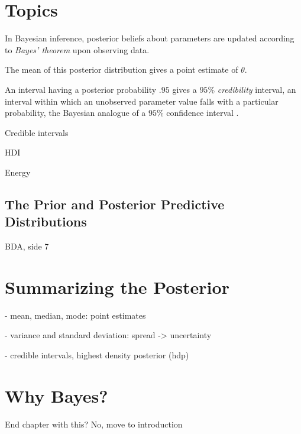 \section{Topics} 

In Bayesian inference, posterior beliefs about parameters are updated according to \textit{Bayes' theorem} upon observing data.  

The mean of this posterior distribution gives a point estimate of $\theta$. 

An interval having a posterior probability $.95$ gives a $95\%$ \textit{credibility} interval, an interval within which an unobserved parameter value falls with a particular probability, the Bayesian analogue of a $95\%$ confidence interval \cite[p. 777]{STK}.

Credible intervals 

HDI 

Energy


\subsection{The Prior and Posterior Predictive Distributions}\label{sec:predictive}

BDA, side 7

\section{Summarizing the Posterior}

- mean, median, mode: point estimates

- variance and standard deviation: spread -> uncertainty 

- credible intervals, highest density posterior (hdp) 



\section{Why Bayes?}

End chapter with this? No, move to introduction
